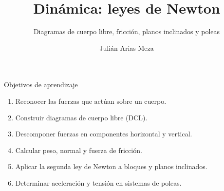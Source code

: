 \documentclass[aspectratio=169,11pt]{beamer}
\title{Dinámica: leyes de Newton}
\subtitle{Diagramas de cuerpo libre, fricción, planos inclinados y poleas}
\author{Julián Arias Meza}
\institute{Física -- Educación Diversificada}
\date{}
\begin{document}
\begin{frame}\titlepage\end{frame}
\begin{frame}{Objetivos de aprendizaje}
\begin{enumerate}
\item Reconocer las fuerzas que actúan sobre un cuerpo.
\item Construir diagramas de cuerpo libre (DCL).
\item Descomponer fuerzas en componentes horizontal y vertical.
\item Calcular peso, normal y fuerza de fricción.
\item Aplicar la segunda ley de Newton a bloques y planos inclinados.
\item Determinar aceleración y tensión en sistemas de poleas.
\end{enumerate}
\end{frame}
\end{document}
